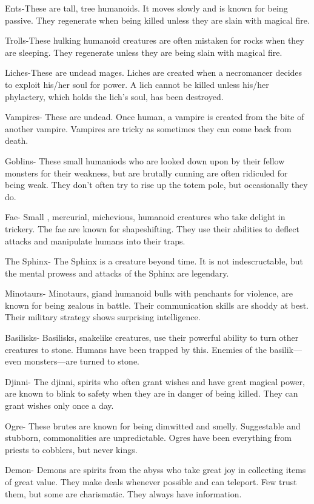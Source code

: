 \documentclass[blue]{guildcamp2}
\begin{document}
Ents-These are tall, tree humanoids. It moves slowly and is known for being passive. They regenerate when being killed unless they are slain with magical fire.

Trolls-These hulking humanoid creatures are often mistaken for rocks when they are sleeping. They regenerate unless they are being slain with magical fire.

Liches-These are undead mages. Liches are created when a necromancer decides to exploit his/her soul for power. A lich cannot be killed unless his/her phylactery, which holds the lich's soul, has been destroyed.

Vampires- These are undead. Once human, a vampire is created from the bite of another vampire. Vampires are tricky as sometimes they can come back from death.

Goblins- These  small humaniods who are looked down upon by their fellow monsters for their weakness, but are brutally cunning are often ridiculed for being weak. They don't often try to rise up the totem pole, but occasionally they do.

Fae- Small , mercurial, michevious, humanoid creatures who take delight in trickery. The fae are known for shapeshifting. They use their abilities to deflect attacks and manipulate humans into their traps.

The Sphinx- The Sphinx is a creature beyond time. It is not indescructable, but the mental prowess and attacks of the Sphinx are legendary. 

Minotaurs- Minotaurs, giand humanoid bulls with penchants for violence, are known for being zealous in battle. Their communication skills are shoddy at best. Their military strategy shows surprising intelligence.

Basilisks- Basilisks, snakelike creatures, use their powerful ability to turn other creatures to stone. Humans have been trapped by this. Enemies of the basilik---even monsters---are turned to stone.

Djinni- The djinni, spirits who often grant wishes and have great magical power, are known to blink to safety when they are in danger of being killed. They can grant wishes only once a day.

Ogre- These brutes are known for being dimwitted and smelly. Suggestable and stubborn, commonalities are unpredictable. Ogres have been everything from priests to cobblers, but never kings.

Demon- Demons are spirits from the abyss who take great joy in collecting items of great value. They make deals whenever possible and can teleport. Few trust them, but some are charismatic. They always have information.
\end{document}
